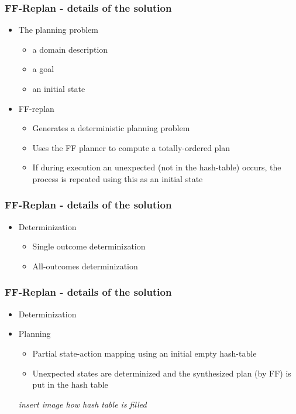 \documentclass{beamer}
\let\origframetitle=\frametitle
\renewcommand\frametitle[1]{\origframetitle{\textbf{\large{\textrm{#1}}}}}
\begin{document}
\begin{frame}
  \frametitle{FF-Replan - details of the solution}

  \begin{itemize}
    \item The planning problem
      \begin{itemize}
        \item a domain description
        \item a goal
        \item an initial state
      \end{itemize}
    \item FF-replan
      \begin{itemize}
        \item Generates a deterministic planning problem
        \item Uses the FF planner to compute a totally-ordered plan
        \item If during execution an unexpected (not in the hash-table) occurs, the process is repeated using this as an initial state
      \end{itemize}
  \end{itemize}
\end{frame}

\begin{frame}
  \frametitle{FF-Replan - details of the solution}

  \begin{itemize}
    \item Determinization
      \begin{itemize}
        \item Single outcome determinization
        \item All-outcomes determinization
      \end{itemize}
   \end{itemize}
\end{frame}

\begin{frame}
  \frametitle{FF-Replan - details of the solution}

  \begin{itemize}
    \item Determinization
    \item Planning
      \begin{itemize}
        \item Partial state-action mapping using an initial empty hash-table
        \item Unexpected states are determinized and the synthesized plan (by FF) is put in the hash table
      \end{itemize}

      \emph{insert image how hash table is filled}

   \end{itemize}
\end{frame}
\end{document}

